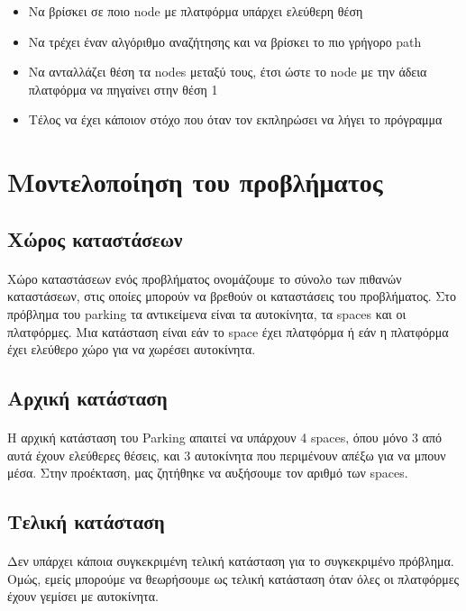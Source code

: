 \documentclass{article}
\begin{document}
    \begin{itemize}
        \item Να βρίσκει σε ποιο node με πλατφόρμα υπάρχει ελεύθερη θέση
        \item Να τρέχει έναν αλγόριθμο αναζήτησης και να βρίσκει το πιο γρήγορο path
        \item Να ανταλλάζει θέση τα nodes μεταξύ τους, έτσι ώστε το node με την άδεια πλατφόρμα να πηγαίνει στην θέση 1
        \item Τέλος να έχει κάποιον στόχο που όταν τον εκπληρώσει να λήγει το πρόγραμμα
    \end{itemize}

    \newpage
    \section{Μοντελοποίηση του προβλήματος}
    \subsection{Χώρος καταστάσεων}
    \paragraph{}
    Χώρο καταστάσεων ενός προβλήματος ονομάζουμε το σύνολο των πιθανών καταστάσεων, στις οποίες μπορούν να βρεθούν οι καταστάσεις του προβλήματος.
    Στο πρόβλημα του parking τα αντικείμενα είναι τα αυτοκίνητα, τα spaces και οι πλατφόρμες. Μια κατάσταση είναι εάν το space έχει πλατφόρμα ή εάν η
    πλατφόρμα έχει ελεύθερο χώρο για να χωρέσει αυτοκίνητα.

    \subsection{Αρχική κατάσταση}
    \paragraph{}
    Η αρχική κατάσταση του Parking απαιτεί να υπάρχουν 4 spaces, όπου μόνο 3 από αυτά έχουν ελεύθερες θέσεις, και 3 αυτοκίνητα που περιμένουν απέξω για 
    να μπουν μέσα. Στην προέκταση, μας ζητήθηκε να αυξήσουμε τον αριθμό των spaces.

    \subsection{Τελική κατάσταση}
    \paragraph{}
    Δεν υπάρχει κάποια συγκεκριμένη τελική κατάσταση για το συγκεκριμένο πρόβλημα. Ομώς, εμείς μπορούμε να θεωρήσουμε ως τελική κατάσταση όταν όλες οι πλατφόρμες
    έχουν γεμίσει με αυτοκίνητα.
\end{document}

